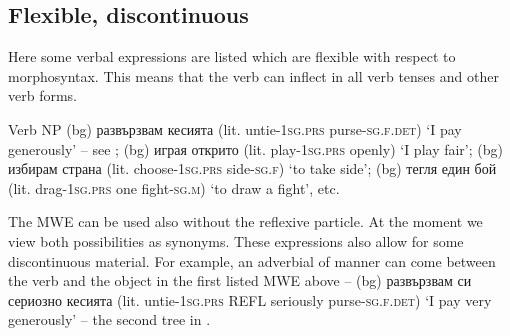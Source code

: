 \documentclass[output=paper,colorlinks,citecolor=brown]{langscibook}
\begin{document}
\subsection{Flexible, discontinuous}

Here some verbal expressions are listed which are flexible with respect to morphosyntax. This means that the verb can inflect in all verb tenses and other verb forms.\largerpage

\ea Verb NP
    \ea (bg) {развързвам кесията } (lit. untie-\textsc{1sg.prs} pur\-se-\textsc{sg.f.det}) {`I pay generously'} -- see ; 
    \ex (bg) {играя открито } (lit. play-\textsc{1sg.prs} openly) {`I play fair'};
    \ex (bg) {избирам страна } (lit. choose-\textsc{1sg.prs} side-\textsc{sg.f}) {`to take side'}; 
    \ex (bg) {тегля един бой } (lit. drag-\textsc{1sg.prs} one fight-\textsc{sg.m}) {`to draw a fight'}, etc.
   \z
\z

The MWE can be used also without the reflexive particle. At the moment we view both possibilities as synonyms. These expressions also allow for some discontinuous material. For example, an adverbial of manner can come between the verb and the object in the first listed MWE above -- 
(bg) {развързвам си сериозно кесията } (lit. untie-\textsc{1sg.prs} REFL seriously purse-\textsc{sg.f.det}) {`I pay very generously'} -- the second tree in .
\end{document}
